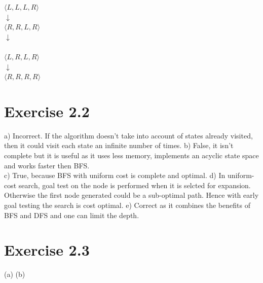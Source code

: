 \documentclass[12pt]{article}
\begin{document}
$\langle L,L,L,R \rangle$ \\ \hspace*{35mm}%
$\downarrow$ \\ \hspace*{25mm}%
$\langle R,R,L,R \rangle$ \\ \hspace*{35mm}%
$\downarrow$ \\ \\ \hspace*{25mm}%
$\langle L,R,L,R \rangle$ \\ \hspace*{35mm}%
$\downarrow$ \\ \hspace*{25mm}%
$\langle R,R,R,R \rangle$ \newpage


\section*{Exercise 2.2}

a) Incorrect. If the algorithm doesn't take into account of states already visited, then it could visit each state an infinite number of times.  \newline
b) False, it isn't complete but it is useful as it uses less memory, implements an acyclic state space and works faster then BFS.  \\
c) True, because BFS with uniform cost is complete and optimal.\newline
d) In uniform-cost search, goal test on the node is performed when it is selcted for expansion. Otherwise the first node generated could be a sub-optimal path. Hence with early goal testing the search is cost optimal.\newline
e) Correct as it combines the benefits of BFS and DFS and one can limit the depth.\newline

\section*{Exercise 2.3}

(a) \newline
(b) 
\end{document}
